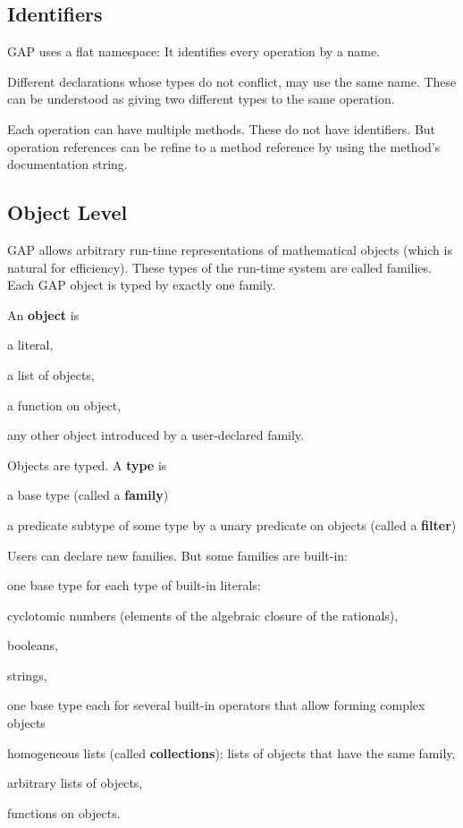 \subsection{Identifiers}

GAP uses a flat namespace: It identifies every operation by a name.

Different declarations whose types do not conflict, may use the same name.
These can be understood as giving two different types to the same operation.

Each operation can have multiple methods.
These do not have identifiers.
But operation references can be refine to a method reference by using the method's documentation string.

\subsection{Object Level}

GAP allows arbitrary run-time representations of mathematical objects (which is natural for efficiency).
These types of the run-time system are called families.
Each GAP object is typed by exactly one family.

An \textbf{object} is
\begin{compactitem}
  \item a literal,
  \item a list of objects,
  \item a function on object,
  \item any other object introduced by a user-declared family.
\end{compactitem}

Objects are typed.
A \textbf{type} is
\begin{compactitem}
  \item a base type (called a \textbf{family})
  \item a predicate subtype of some type by a unary predicate on objects (called a \textbf{filter})
\end{compactitem}

Users can declare new families.
But some families are built-in:
\begin{compactitem}
  \item one base type for each type of built-in literals:
    \begin{compactitem}
      \item cyclotomic numbers (elements of the algebraic closure of the rationals),
      \item booleans,
      \item strings,
    \end{compactitem}
  \item one base type each for several built-in operators that allow forming complex objects
    \begin{compactitem}
      \item homogeneous lists (called \textbf{collections}): lists of objects that have the same family,
      \item arbitrary lists of objects,
      \item functions on objects.
    \end{compactitem}
\end{compactitem}

